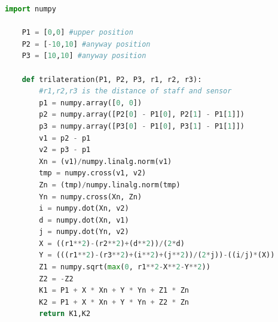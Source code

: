 \documentclass[12pt,a4paper]{article}
\begin{document}
\begin{lstlisting}[language=Python]
    import numpy
    
    P1 = [0,0] #upper position
    P2 = [-10,10] #anyway position
    P3 = [10,10] #anyway position
    
    def trilateration(P1, P2, P3, r1, r2, r3):
        #r1,r2,r3 is the distance of staff and sensor
        p1 = numpy.array([0, 0])
        p2 = numpy.array([P2[0] - P1[0], P2[1] - P1[1]])
        p3 = numpy.array([P3[0] - P1[0], P3[1] - P1[1]])
        v1 = p2 - p1
        v2 = p3 - p1
        Xn = (v1)/numpy.linalg.norm(v1)
        tmp = numpy.cross(v1, v2)
        Zn = (tmp)/numpy.linalg.norm(tmp)
        Yn = numpy.cross(Xn, Zn)
        i = numpy.dot(Xn, v2)
        d = numpy.dot(Xn, v1)
        j = numpy.dot(Yn, v2)
        X = ((r1**2)-(r2**2)+(d**2))/(2*d)
        Y = (((r1**2)-(r3**2)+(i**2)+(j**2))/(2*j))-((i/j)*(X))
        Z1 = numpy.sqrt(max(0, r1**2-X**2-Y**2))
        Z2 = -Z2
        K1 = P1 + X * Xn + Y * Yn + Z1 * Zn
        K2 = P1 + X * Xn + Y * Yn + Z2 * Zn
        return K1,K2
\end{lstlisting}
\end{document}
